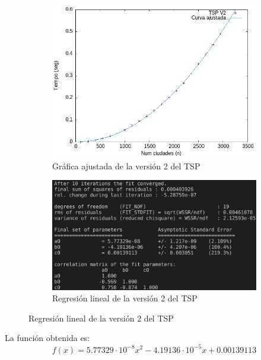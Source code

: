 \documentclass{article}
\begin{document}
\begin{figure}[H]
    \centering
    \begin{subfigure}[b]{0.4\textwidth}
        \centering
        \includegraphics[width=\textwidth]{Problema4/imagenes/Salida_ajustada_v2.png}
        \caption{Gráfica ajustada de la versión 2 del TSP}
        \label{fig:p4_v2_ajuste}
    \end{subfigure}
    \hfill
    \begin{subfigure}[b]{0.5\textwidth}
        \centering
        \includegraphics[width=\textwidth]{Problema4/imagenes/v2_fit_log.png}
        \caption{Regresión lineal de la versión 2 del TSP}
        \label{fig:p4_v2_fit}
    \end{subfigure}
\end{figure}

La función obtenida es:
\begin{equation*}
    f(x) = 5.77329\cdot10^{-8}x^{2} - 4.19136 \cdot10^{-5}x + 0.00139113
\end{equation*}
\end{document}
